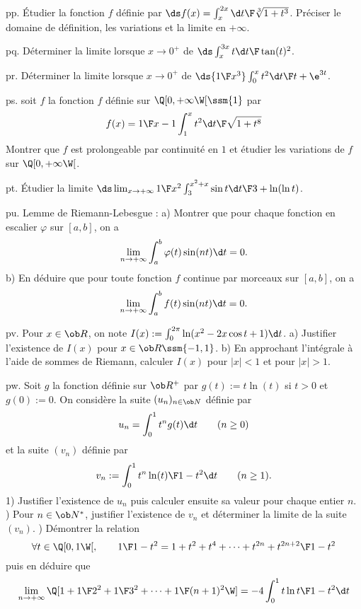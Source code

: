 \exo [Level=1,Fight=2,Learn=2,Field=\FonctionsDéfiniesParUneIntégrale,Type=\Exercices,Origin=] pp. 
Étudier la fonction $f$ définie par $\ds f(x)=\int_x^{2x}{\d t\F\root 3\of{1+t^3}}$. \pn
Préciser le domaine de définition, les variations et la limite en $+\infty$. \pn

\exo [Level=1,Fight=2,Learn=2,Field=\FonctionsDéfiniesParUneIntégrale,Type=\Exercices,Origin=] pq. 
Déterminer la limite lorsque $x\to0^+$ de $\ds\int_x^{3x}{t\d t\F \tan(t)^2}$. 

\exo [Level=1,Fight=2,Learn=2,Field=\FonctionsDéfiniesParUneIntégrale,Type=\Exercices,Origin=] pr. 
Déterminer la limite lorsque $x\to0^+$ de $\ds {1\F x^3}\int_0^x{t^2\d t\F t+\e^{3t}}$. 

\exo [Level=1,Fight=2,Learn=2,Field=\FonctionsDéfiniesParUneIntégrale,Type=\Exercices,Origin=] ps. 
soit $f$ la fonction $f$ définie sur $\Q[0,+\infty\W[\ssm\{1\}$ par 
$$
f(x)={1\F x-1}\int_1^x{t^2\d t\F\sqrt{1+t^8}}
$$
Montrer que $f$ est prolongeable par continuité en $1$ et étudier les variations de $f$ sur $\Q[0,+\infty\W[$. 

\exo [Level=1,Fight=2,Learn=2,Field=\Intégration,Type=\Exercices,Origin=,Indication={On pourras scinder l'intégrale en deux et utiliser la formule de la moyenne.}] pt. 
Étudier la limite $\ds\lim_{x\to+\infty}{1\F x^2}\int_3^{x^2+x}{\sin t\d t\F 3+\ln(\ln t)}$. \pn



\exo [Level=1,Fight=2,Learn=2,Field=\Intégration,Type=\Exercices,Origin=] pu. 
Lemme de Riemann-Lebesgue : \pn
a) Montrer que pour chaque fonction en escalier $\varphi$ sur $[a,b]$, on a 
$$
\lim_{n\to+\infty}\int_a^b\varphi(t)\sin(nt)\d t=0.
$$
b) En déduire que pour toute fonction $f$ continue par morceaux sur $[a,b]$, on a 
$$
\lim_{n\to+\infty}\int_a^bf(t)\sin(nt)\d t=0.
$$

\exo [Level=1,Fight=2,Learn=2,Field=\FonctionsDéfiniesParUneIntégrale,Type=\Exercices,Origin=] pv. 
Pour $x\in\ob R$, on note $I(x):=\int_0^{2\pi}\ln(x^2-2x\cos t+1)\d t$. \pn
a) Justifier l'existence de $I(x)$ pour $x\in\ob R\ssm\{-1,1\}$. \pn
b) En approchant l'intégrale à l'aide de sommes de Riemann, calculer $I(x)$ pour $|x|<1$ et pour $|x|>1$.  

\exo [Level=1,Fight=2,Learn=2,Field=\FonctionsDéfiniesParUneIntégrale,Type=\Exercices,Origin=,Indication={2) On pourra introduire la fonction $\ds t\mapsto {t\ln t\F 1-t^2}$.}] pw. 
Soit $g$ la fonction définie sur $\ob R^+$ par $g(t):=t\ln(t)$ si $t>0$ et $g(0):=0$. On considère la suite $(u_n)_{n\in\ob N}$ définie par 
$$
u_n=\int_0^1t^ng(t)\d t\qquad(n\ge0)
$$
et la suite $(v_n)$ définie par 
$$
v_n:=\int_0^1{t^n\ln(t)\F1-t^2}\d t\qquad(n\ge1).
$$
1) Justifier l'existence de $u_n$ puis calculer ensuite sa valeur pour chaque entier $n$. ) Pour $n\in\ob N^*$, justifier l'existence de $v_n$ et déterminer la limite de la suite $(v_n)$. ) Démontrer la relation 
$$
\forall t\in\Q[0,1\W[,\qquad {1\F1-t^2}=1+t^2+t^4+\cdots+t^{2n}+{t^{2n+2}\F 1-t^2}
$$
puis en déduire que 
$$
\lim_{n\to+\infty}\Q[1+{1\F 2^2}+{1\F 3^2}+\cdots+{1\F (n+1)^2}\W]=-4\int_0^1{t\ln t\F 1-t^2}\d t
$$

